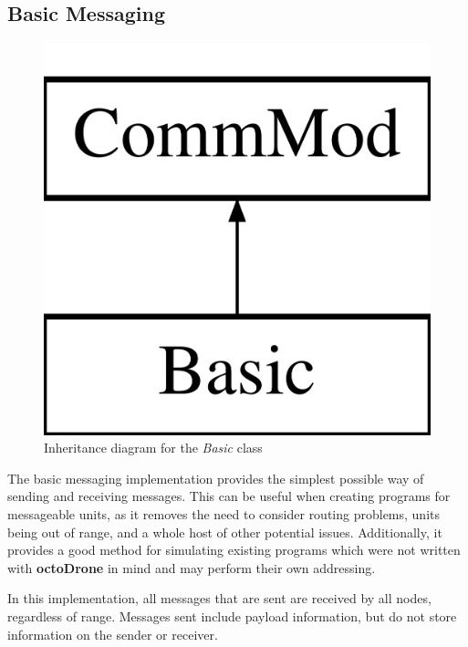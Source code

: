 \subsection{Basic Messaging}
\begin{figure}[H]
\centering
\includegraphics[scale=0.2]{../documentation/latex/class_basic}	
\caption{Inheritance diagram for the \textit{Basic} class}
\end{figure}

The basic messaging implementation provides the simplest possible way of sending and receiving messages. This can be useful when creating programs for messageable units, as it removes the need to consider routing problems, units being out of range, and a whole host of other potential issues. Additionally, it provides a good method for simulating existing programs which were not written with \textbf{octoDrone} in mind and may perform their own addressing.

In this implementation, all messages that are sent are received by all nodes, regardless of range. Messages sent include payload information, but do not store information on the sender or receiver.
	
